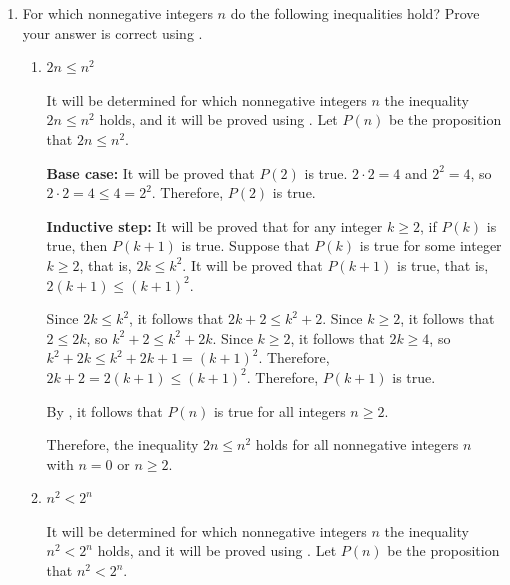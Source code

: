 \begin{enumerate}
\begin{enumerate}
\begin{subprove}
      By the inductive hypothesis, \(1 + 2 + 2^{2} + \ldots + 2^{k} = 2^{k+1} - 1\).
      Therefore, \(1 + 2 + 2^{2} + \ldots + 2^{k+1} = (1 + 2 + 2^{2} + \ldots + 2^{k}) + 2^{k+1} = (2^{k+1} - 1) + 2^{k+1} = 2 \cdot 2^{k+1} - 1 = 2^{k+2} - 1\).
      
      Therefore, \(P(k+1)\) is true.
      
      By , it follows that \(P(n)\) is true for all nonnegative integers \(n\).
    \end{subprove}
  \end{enumerate}
  \item For which nonnegative integers \(n\) do the following inequalities hold?
  Prove your answer is correct using .
  \begin{enumerate}
    \item \(2 n \leq n^{2}\)
    \begin{subprove}
      It will be determined for which nonnegative integers \(n\) the inequality \(2 n \leq n^{2}\) holds, and it will be proved using .
      Let \(P(n)\) be the proposition that \(2 n \leq n^{2}\).
      
      \textbf{Base case:} It will be proved that \(P(2)\) is true.
      \(2 \cdot 2 = 4\) and \(2^{2} = 4\), so \(2 \cdot 2 = 4 \leq 4 = 2^{2}\).
      Therefore, \(P(2)\) is true.
      
      \textbf{Inductive step:} It will be proved that for any integer \(k \geq 2\), if \(P(k)\) is true, then \(P(k+1)\) is true.
      Suppose that \(P(k)\) is true for some integer \(k \geq 2\), that is, \(2 k \leq k^{2}\).
      It will be proved that \(P(k+1)\) is true, that is, \(2(k+1) \leq (k+1)^{2}\).
      
      Since \(2 k \leq k^{2}\), it follows that \(2 k + 2 \leq k^{2} + 2\).
      Since \(k \geq 2\), it follows that \(2 \leq 2k\), so \(k^{2} + 2 \leq k^{2} + 2k\).
      Since \(k \geq 2\), it follows that \(2k \geq 4\), so \(k^{2} + 2k \leq k^{2} + 2k + 1 = (k+1)^{2}\).
      Therefore, \(2 k + 2 = 2(k+1) \leq (k+1)^{2}\).
      Therefore, \(P(k+1)\) is true.
      
      By , it follows that \(P(n)\) is true for all integers \(n \geq 2\).
      
      Therefore, the inequality \(2 n \leq n^{2}\) holds for all nonnegative integers \(n\) with \(n = 0\) or \(n \geq 2\).
    \end{subprove}
    \item \(n^{2} < 2^{n}\)
    \begin{subprove}
      It will be determined for which nonnegative integers \(n\) the inequality \(n^{2} < 2^{n}\) holds, and it will be proved using .
      Let \(P(n)\) be the proposition that \(n^{2} < 2^{n}\).
      

\end{subprove}
\end{enumerate}
\end{enumerate}
